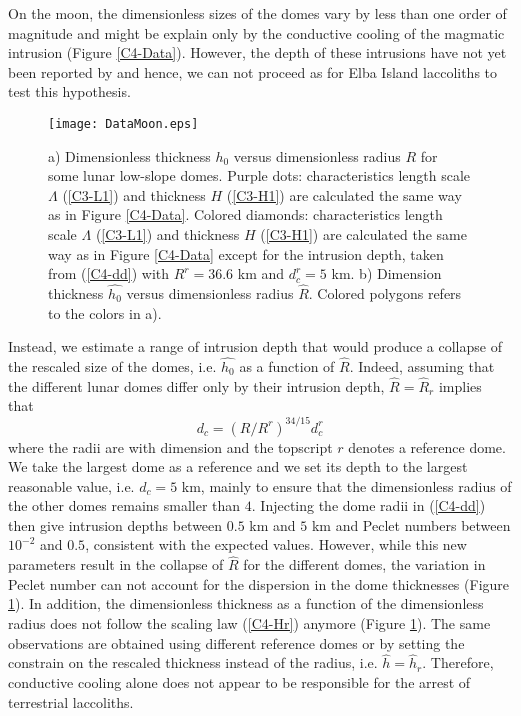 On the  moon, the dimensionless sizes  of the domes vary  by less than
one order  of magnitude and  might be  explain only by  the conductive
cooling of the magmatic intrusion (Figure \ref{C4-Data}). However, the
depth   of  these   intrusions   have  not   yet   been  reported   by
\citet{Wohler:2009jj} and hence, we can not proceed as for Elba Island
laccoliths to test this hypothesis.
\begin{figure}[h!]
  \begin{center}
    \graphicspath{ {/Users/thorey/Documents/These/Projet/Refroidissement/Skin_Model/Figure/Figure_Heating/} }
    \texttt{[image: DataMoon.eps]}
    \caption{  a) Dimensionless  thickness $h_0$  versus dimensionless
      radius  $R$  for  some  lunar  low-slope  domes.   Purple  dots:
      characteristics   length  scale   $\Lambda$  (\ref{C3-L1})   and
      thickness $H$  (\ref{C3-H1}) are calculated  the same way  as in
      Figure \ref{C4-Data}.  Colored  diamonds: characteristics length
      scale  $\Lambda$ (\ref{C3-L1})  and thickness  $H$ (\ref{C3-H1})
      are calculated  the same way  as in Figure  \ref{C4-Data} except
      for  the   intrusion  depth,   taken  from   (\ref{C4-dd})  with
      $R^r  =  36.6$ km  and  $d_c^r=5$  km.  b)  Dimension  thickness
      $\hat{h_0}$  versus  dimensionless  radius  $\hat{R}$.   Colored
      polygons refers to the colors in a).}
    \label{C4-ArrestMoon}
  \end{center}
\end{figure}
Instead, we estimate  a range of intrusion depth that  would produce a
collapse of  the rescaled size  of the  domes, i.e.  $\hat{h_0}$  as a
function  of $\hat{R}$.   Indeed,  assuming that  the different  lunar
domes  differ  only  by  their  intrusion  depth,  $\hat{R}=\hat{R}_r$
implies that
\begin{equation}
  d_c = \left(R/R^r\right)^{34/15}d_c^r
  \label{C4-dd}
\end{equation}
where the  radii are with  dimension and  the topscript $r$  denotes a
reference dome. We take the largest dome as a reference and we set its
depth to  the largest  reasonable value, i.e.   $d_c=5$ km,  mainly to
ensure  that  the dimensionless  radius  of  the other  domes  remains
smaller than $4$.  Injecting the dome radii in (\ref{C4-dd}) then give
intrusion  depths between  $0.5$  km  and $5$  km  and Peclet  numbers
between   $10^{-2}$   and   $0.5$,  consistent   with   the   expected
values. However, while  this new parameters result in  the collapse of
$\hat{R}$ for the different domes,  the variation in Peclet number can
not  account  for  the  dispersion in  the  dome  thicknesses  (Figure
\ref{C4-ArrestMoon}).  In  addition, the dimensionless thickness  as a
function of the  dimensionless radius does not follow  the scaling law
(\ref{C4-Hr})   anymore   (Figure  \ref{C4-ArrestMoon}).    The   same
observations  are  obtained  using  different reference  domes  or  by
setting the constrain on the rescaled thickness instead of the radius,
i.e. $\hat{h}=\hat{h}_r$. Therefore, conductive cooling alone does not
appear to be responsible for the arrest of terrestrial laccoliths.

